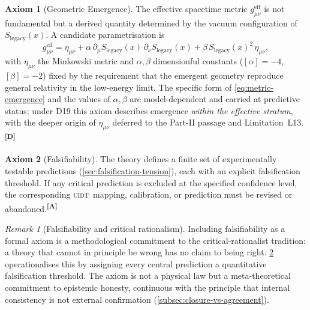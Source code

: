 \documentclass[12pt,a4paper,twoside]{article}
\theoremstyle{plain}
\theoremstyle{definition}
\newtheorem{axiom}{Axiom}
\theoremstyle{remark}
\newtheorem{remark}[theorem]{Remark}
\newcommand{\UIDT}{\textsc{uidt}} %
\newcommand{\catmark}[1]{\textsuperscript{\textsf{\textbf{[#1]}}}}
\newcommand{\LegacySx}{S_{\mathrm{legacy}}(x)} %
\begin{document}
\begin{axiom}[Geometric Emergence]
\label{ax:emergence}
The effective spacetime metric $g_{\mu\nu}^{\mathrm{eff}}$ is not
fundamental but a derived quantity determined by the vacuum
configuration of $\LegacySx$. A candidate parametrisation is
\begin{equation}
 g_{\mu\nu}^{\mathrm{eff}} = \eta_{\mu\nu}
 + \alpha\,\partial_\mu\LegacySx\,\partial_\nu\LegacySx
 + \beta\,\LegacySx^2\,\eta_{\mu\nu},
 \label{eq:metric-emergence}
\end{equation}
with $\eta_{\mu\nu}$ the Minkowski metric and $\alpha,\beta$
dimensionful constants ($[\alpha]=-4$, $[\beta]=-2$) fixed by the
requirement that the emergent geometry reproduce general relativity in
the low-energy limit. The specific form of \cref{eq:metric-emergence}
and the values of $\alpha,\beta$ are model-dependent and carried at
predictive status; under D19 this axiom describes emergence \emph{within
the effective stratum}, with the deeper origin of $\eta_{\mu\nu}$
deferred to the Part-II passage and Limitation~L13.\catmark{D}
\end{axiom}

\begin{axiom}[Falsifiability]
\label{ax:falsifiability}
The theory defines a finite set of experimentally testable predictions
(\cref{sec:falsification-tension}), each with an explicit falsification
threshold. If any critical prediction is excluded at the specified
confidence level, the corresponding \UIDT\ mapping, calibration, or
prediction must be revised or abandoned.\catmark{A}
\end{axiom}

\begin{remark}[Falsifiability and critical rationalism]
\label{rem:popper}
Including falsifiability as a formal axiom is a methodological
commitment to the critical-rationalist tradition: a theory that cannot
in principle be wrong has no claim to being right.
\cref{ax:falsifiability} operationalises this by assigning every central
prediction a quantitative falsification threshold. The axiom is not a
physical law but a meta-theoretical commitment to epistemic honesty,
continuous with the principle that internal consistency is not external
confirmation (\cref{subsec:closure-vs-agreement}).
\end{remark}
\end{document}
